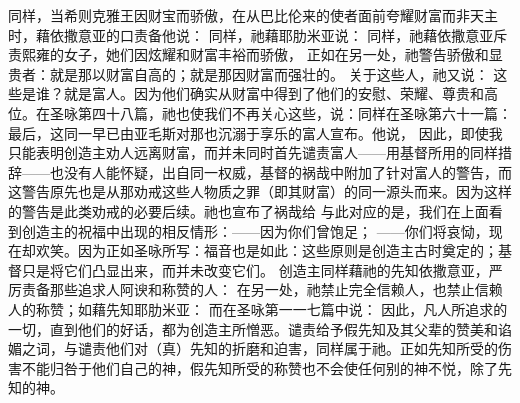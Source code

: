 同样，当希则克雅王因财宝而骄傲，在从巴比伦来的使者面前夸耀财富而非天主时，藉依撒意亚的口责备他说：  同样，祂藉耶肋米亚说：  同样，祂藉依撒意亚斥责熙雍的女子，她们因炫耀和财富丰裕而骄傲， 正如在另一处，祂警告骄傲和显贵者：就是那以财富自高的；就是那因财富而强壮的。 关于这些人，祂又说：  这些是谁？就是富人。因为他们确实从财富中得到了他们的安慰、荣耀、尊贵和高位。在圣咏第四十八篇，祂也使我们不再关心这些，说：同样在圣咏第六十一篇：最后，这同一早已由亚毛斯对那也沉溺于享乐的富人宣布。他说，  因此，即使我只能表明创造主劝人远离财富，而并未同时首先谴责富人——用基督所用的同样措辞——也没有人能怀疑，出自同一权威，基督的祸哉中附加了针对富人的警告，而这警告原先也是从那劝戒这些人物质之罪（即其财富）的同一源头而来。因为这样的警告是此类劝戒的必要后续。祂也宣布了祸哉给  与此对应的是，我们在上面看到创造主的祝福中出现的相反情形：——因为你们曾饱足； ——你们将哀恸，现在却欢笑。因为正如圣咏所写：福音也是如此：这些原则是创造主古时奠定的；基督只是将它们凸显出来，而并未改变它们。  创造主同样藉祂的先知依撒意亚，严厉责备那些追求人阿谀和称赞的人：  在另一处，祂禁止完全信赖人，也禁止信赖人的称赞；如藉先知耶肋米亚：  而在圣咏第一一七篇中说： 因此，凡人所追求的一切，直到他们的好话，都为创造主所憎恶。谴责给予假先知及其父辈的赞美和谄媚之词，与谴责他们对（真）先知的折磨和迫害，同样属于祂。正如先知所受的伤害不能归咎于他们自己的神，假先知所受的称赞也不会使任何别的神不悦，除了先知的神。\par

